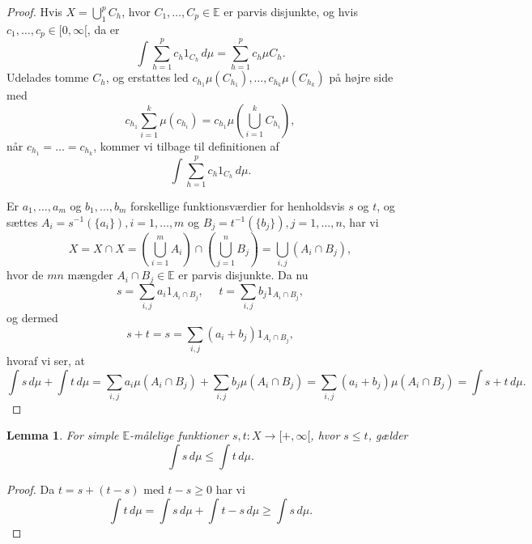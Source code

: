 \documentclass[12pt]{report}
\newtheorem{lemma}{Lemma}
\theoremstyle{break}
\newtheorem*{proof}{Bevis}
\theoremstyle{break}
\newcommand{\Int}[1]{\int#1\,d\mu}
\newcommand{\EE}{\mathbb{E}}
\begin{document}
\begin{proof}
Hvis $X=\bigcup_1^pC_h$, hvor $C_1,\ldots,C_p\in\EE$ er parvis disjunkte, og hvis $c_1,\ldots,c_p\in[0,\infty[$, da er
\[\Int{\sum_{h=1}^pc_h1_{C_h}} = \sum_{h=1}^pc_h\mu{C_h}.\]
Udelades tomme $C_h$, og erstattes led $c_{h_1}\mu(C_{h_1}),\ldots,c_{h_k}\mu(C_{h_k})$ på højre side med
\[c_{h_1}\sum_{i=1}^{k}\mu(c_{h_i})=c_{h_1}\mu(\bigcup_{i=1}^kC_{h_i}),\]
når $c_{h_1}=\ldots=c_{h_k}$, kommer vi tilbage til definitionen af \[\Int{\sum_{h=1}^pc_h1_{C_h}}.\]

\bigskip

Er $a_1,\ldots,a_m$ og $b_1,\ldots,b_m$ forskellige funktionsværdier for henholdsvis $s$ og $t$, og sættes $A_i = s^{-1}(\{a_i\}), i=1,\ldots,m$ og $B_j = t^{-1}(\{b_j\}), j=1,\ldots,n$, har vi
\[X = X\cap X = \left(\bigcup_{i=1}^m A_i\right)\cap\left(\bigcup_{j=1}^n B_j\right) = \bigcup_{i,j} (A_i\cap B_j),\]
hvor de $mn$ mængder $A_i\cap B_j\in\EE$ er parvis disjunkte. Da nu
\[s=\sum_{i,j}a_i1_{A_i\cap B_j},~~~~~~t=\sum_{i,j}b_j1_{A_i\cap B_j},\]
og dermed
\[s+t = s=\sum_{i,j}(a_i+b_j)1_{A_i\cap B_j},\]
hvoraf vi ser, at 
\[\Int{s}+\Int{t}=\sum_{i,j}a_i\mu(A_i\cap B_j)+\sum_{i,j}b_j\mu(A_i\cap B_j) = \sum_{i,j}(a_i+b_j)\mu(A_i\cap B_j)=\Int{s+t}.\]
\end{proof}
\begin{lemma}
For simple $\EE$-målelige funktioner $s,t\colon X\to[+,\infty[$, hvor $s\leq t$, gælder
\[\Int{s}\leq\Int{t}.\]
\end{lemma}
\begin{proof}
Da $t=s+(t-s)$ med $t-s\geq 0$ har vi
\[\Int{t}=\Int{s}+\Int{t-s}\geq\Int{s}.\]
\end{proof}


\newpage
\end{document}
